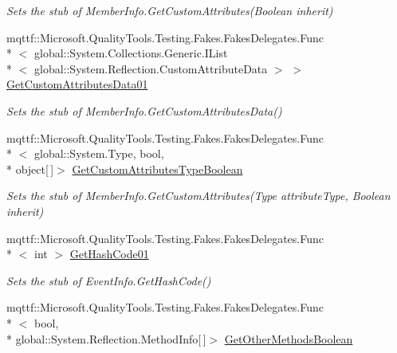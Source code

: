 \begin{DoxyCompactItemize}
\begin{DoxyCompactList}\small\item\em Sets the stub of Member\-Info.\-Get\-Custom\-Attributes(\-Boolean inherit)\end{DoxyCompactList}\item 
mqttf\-::\-Microsoft.\-Quality\-Tools.\-Testing.\-Fakes.\-Fakes\-Delegates.\-Func\\*
$<$ global\-::\-System.\-Collections.\-Generic.\-I\-List\\*
$<$ global\-::\-System.\-Reflection.\-Custom\-Attribute\-Data $>$ $>$ \hyperlink{class_system_1_1_reflection_1_1_fakes_1_1_stub_event_info_a3218d4d3dc2839f95eee0ea2410f3791}{Get\-Custom\-Attributes\-Data01}
\begin{DoxyCompactList}\small\item\em Sets the stub of Member\-Info.\-Get\-Custom\-Attributes\-Data()\end{DoxyCompactList}\item 
mqttf\-::\-Microsoft.\-Quality\-Tools.\-Testing.\-Fakes.\-Fakes\-Delegates.\-Func\\*
$<$ global\-::\-System.\-Type, bool, \\*
object\mbox{[}$\,$\mbox{]}$>$ \hyperlink{class_system_1_1_reflection_1_1_fakes_1_1_stub_event_info_ae9ed04babd2a666e369f54e91fac61d8}{Get\-Custom\-Attributes\-Type\-Boolean}
\begin{DoxyCompactList}\small\item\em Sets the stub of Member\-Info.\-Get\-Custom\-Attributes(\-Type attribute\-Type, Boolean inherit)\end{DoxyCompactList}\item 
mqttf\-::\-Microsoft.\-Quality\-Tools.\-Testing.\-Fakes.\-Fakes\-Delegates.\-Func\\*
$<$ int $>$ \hyperlink{class_system_1_1_reflection_1_1_fakes_1_1_stub_event_info_af5875691404946cb20ac39a138375c63}{Get\-Hash\-Code01}
\begin{DoxyCompactList}\small\item\em Sets the stub of Event\-Info.\-Get\-Hash\-Code()\end{DoxyCompactList}\item 
mqttf\-::\-Microsoft.\-Quality\-Tools.\-Testing.\-Fakes.\-Fakes\-Delegates.\-Func\\*
$<$ bool, \\*
global\-::\-System.\-Reflection.\-Method\-Info\mbox{[}$\,$\mbox{]}$>$ \hyperlink{class_system_1_1_reflection_1_1_fakes_1_1_stub_event_info_a10c892f5a8ba6459a9fb15c3142b2d52}{Get\-Other\-Methods\-Boolean}

\end{DoxyCompactItemize}
